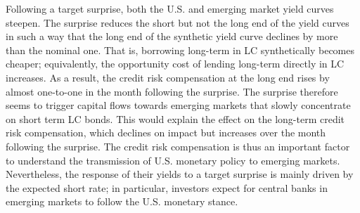 {Following a target surprise, both the U.S. and emerging market yield curves steepen. %
The surprise reduces the short but not the long end of the yield curves in such a way that the long end of the synthetic yield curve declines by more than the nominal one. 
That is, borrowing long-term in LC synthetically becomes cheaper; equivalently, the opportunity cost of lending long-term directly in LC increases.
As a result, the credit risk compensation at the long end rises %
by almost one-to-one in the month following the surprise. %
The surprise therefore seems to trigger capital flows towards emerging markets that slowly concentrate on short term LC bonds.
This would explain the effect on the long-term credit risk compensation, which declines on impact but increases over the month following the surprise. %
The credit risk compensation is thus an important factor to understand %
the transmission of U.S. monetary policy to emerging markets.
Nevertheless, the response of their yields %
to a target surprise is mainly driven by the expected short rate; in particular, %
investors expect for central banks in emerging markets  to follow the U.S. monetary stance. %

}
